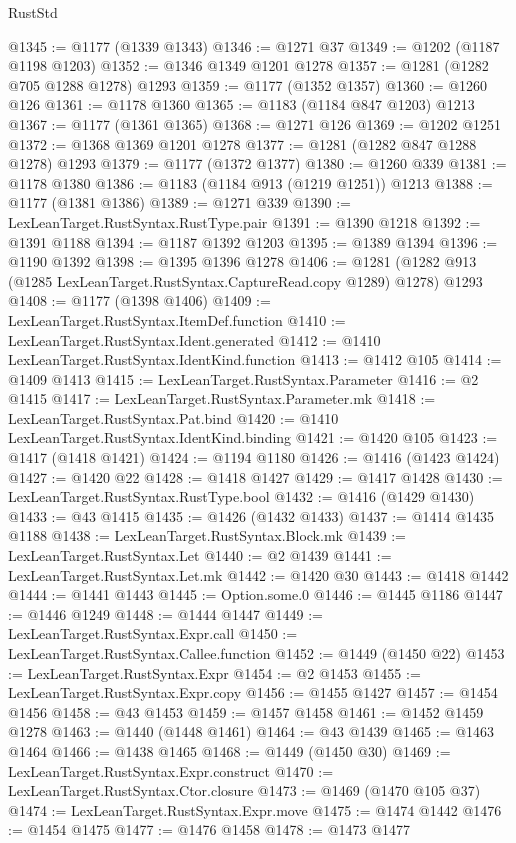 \begin{lexlean}{RustStd}
\begin{coremodule}
@1345 := @1177 (@1339 @1343)
@1346 := @1271 @37
@1349 := @1202 (@1187 @1198 @1203)
@1352 := @1346 @1349 @1201 @1278
@1357 := @1281 (@1282 @705 @1288 @1278) @1293
@1359 := @1177 (@1352 @1357)
@1360 := @1260 @126
@1361 := @1178 @1360
@1365 := @1183 (@1184 @847 @1203) @1213
@1367 := @1177 (@1361 @1365)
@1368 := @1271 @126
@1369 := @1202 @1251
@1372 := @1368 @1369 @1201 @1278
@1377 := @1281 (@1282 @847 @1288 @1278) @1293
@1379 := @1177 (@1372 @1377)
@1380 := @1260 @339
@1381 := @1178 @1380
@1386 := @1183 (@1184 @913 (@1219 @1251)) @1213
@1388 := @1177 (@1381 @1386)
@1389 := @1271 @339
@1390 := LexLeanTarget.RustSyntax.RustType.pair
@1391 := @1390 @1218
@1392 := @1391 @1188
@1394 := @1187 @1392 @1203
@1395 := @1389 @1394
@1396 := @1190 @1392
@1398 := @1395 @1396 @1278
@1406 := @1281 (@1282 @913 (@1285 LexLeanTarget.RustSyntax.CaptureRead.copy @1289) @1278) @1293
@1408 := @1177 (@1398 @1406)
@1409 := LexLeanTarget.RustSyntax.ItemDef.function
@1410 := LexLeanTarget.RustSyntax.Ident.generated
@1412 := @1410 LexLeanTarget.RustSyntax.IdentKind.function
@1413 := @1412 @105
@1414 := @1409 @1413
@1415 := LexLeanTarget.RustSyntax.Parameter
@1416 := @2 @1415
@1417 := LexLeanTarget.RustSyntax.Parameter.mk
@1418 := LexLeanTarget.RustSyntax.Pat.bind
@1420 := @1410 LexLeanTarget.RustSyntax.IdentKind.binding
@1421 := @1420 @105
@1423 := @1417 (@1418 @1421)
@1424 := @1194 @1180
@1426 := @1416 (@1423 @1424)
@1427 := @1420 @22
@1428 := @1418 @1427
@1429 := @1417 @1428
@1430 := LexLeanTarget.RustSyntax.RustType.bool
@1432 := @1416 (@1429 @1430)
@1433 := @43 @1415
@1435 := @1426 (@1432 @1433)
@1437 := @1414 @1435 @1188
@1438 := LexLeanTarget.RustSyntax.Block.mk
@1439 := LexLeanTarget.RustSyntax.Let
@1440 := @2 @1439
@1441 := LexLeanTarget.RustSyntax.Let.mk
@1442 := @1420 @30
@1443 := @1418 @1442
@1444 := @1441 @1443
@1445 := Option.some.{0}
@1446 := @1445 @1186
@1447 := @1446 @1249
@1448 := @1444 @1447
@1449 := LexLeanTarget.RustSyntax.Expr.call
@1450 := LexLeanTarget.RustSyntax.Callee.function
@1452 := @1449 (@1450 @22)
@1453 := LexLeanTarget.RustSyntax.Expr
@1454 := @2 @1453
@1455 := LexLeanTarget.RustSyntax.Expr.copy
@1456 := @1455 @1427
@1457 := @1454 @1456
@1458 := @43 @1453
@1459 := @1457 @1458
@1461 := @1452 @1459 @1278
@1463 := @1440 (@1448 @1461)
@1464 := @43 @1439
@1465 := @1463 @1464
@1466 := @1438 @1465
@1468 := @1449 (@1450 @30)
@1469 := LexLeanTarget.RustSyntax.Expr.construct
@1470 := LexLeanTarget.RustSyntax.Ctor.closure
@1473 := @1469 (@1470 @105 @37)
@1474 := LexLeanTarget.RustSyntax.Expr.move
@1475 := @1474 @1442
@1476 := @1454 @1475
@1477 := @1476 @1458
@1478 := @1473 @1477

\end{coremodule}
\end{lexlean}
